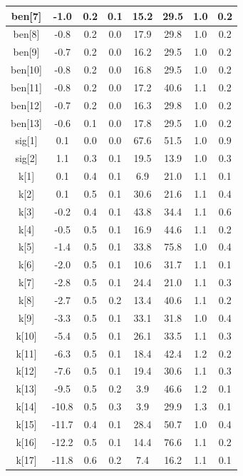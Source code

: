 \begin{longtable}{|c|c|c|c|c|c|c|c|}
\hline
ben[7] & -1.0 & 0.2 & 0.1 & 15.2 & 29.5 & 1.0 & 0.2 \\
\hline
ben[8] & -0.8 & 0.2 & 0.0 & 17.9 & 29.8 & 1.0 & 0.2 \\
\hline
ben[9] & -0.7 & 0.2 & 0.0 & 16.2 & 29.5 & 1.0 & 0.2 \\
\hline
ben[10] & -0.8 & 0.2 & 0.0 & 16.8 & 29.5 & 1.0 & 0.2 \\
\hline
ben[11] & -0.8 & 0.2 & 0.0 & 17.2 & 40.6 & 1.1 & 0.2 \\
\hline
ben[12] & -0.7 & 0.2 & 0.0 & 16.3 & 29.8 & 1.0 & 0.2 \\
\hline
ben[13] & -0.6 & 0.1 & 0.0 & 17.8 & 29.5 & 1.0 & 0.2 \\
\hline
sig[1] & 0.1 & 0.0 & 0.0 & 67.6 & 51.5 & 1.0 & 0.9 \\
\hline
sig[2] & 1.1 & 0.3 & 0.1 & 19.5 & 13.9 & 1.0 & 0.3 \\
\hline
k[1] & 0.1 & 0.4 & 0.1 & 6.9 & 21.0 & 1.1 & 0.1 \\
\hline
k[2] & 0.1 & 0.5 & 0.1 & 30.6 & 21.6 & 1.1 & 0.4 \\
\hline
k[3] & -0.2 & 0.4 & 0.1 & 43.8 & 34.4 & 1.1 & 0.6 \\
\hline
k[4] & -0.5 & 0.5 & 0.1 & 16.9 & 44.6 & 1.1 & 0.2 \\
\hline
k[5] & -1.4 & 0.5 & 0.1 & 33.8 & 75.8 & 1.0 & 0.4 \\
\hline
k[6] & -2.0 & 0.5 & 0.1 & 10.6 & 31.7 & 1.1 & 0.1 \\
\hline
k[7] & -2.8 & 0.5 & 0.1 & 24.4 & 21.0 & 1.1 & 0.3 \\
\hline
k[8] & -2.7 & 0.5 & 0.2 & 13.4 & 40.6 & 1.1 & 0.2 \\
\hline
k[9] & -3.3 & 0.5 & 0.1 & 33.1 & 31.8 & 1.0 & 0.4 \\
\hline
k[10] & -5.4 & 0.5 & 0.1 & 26.1 & 33.5 & 1.1 & 0.3 \\
\hline
k[11] & -6.3 & 0.5 & 0.1 & 18.4 & 42.4 & 1.2 & 0.2 \\
\hline
k[12] & -7.6 & 0.5 & 0.1 & 19.4 & 30.6 & 1.1 & 0.3 \\
\hline
k[13] & -9.5 & 0.5 & 0.2 & 3.9 & 46.6 & 1.2 & 0.1 \\
\hline
k[14] & -10.8 & 0.5 & 0.3 & 3.9 & 29.9 & 1.3 & 0.1 \\
\hline
k[15] & -11.7 & 0.4 & 0.1 & 28.4 & 50.7 & 1.0 & 0.4 \\
\hline
k[16] & -12.2 & 0.5 & 0.1 & 14.4 & 76.6 & 1.1 & 0.2 \\
\hline
k[17] & -11.8 & 0.6 & 0.2 & 7.4 & 16.2 & 1.1 & 0.1 \\

\end{longtable}
